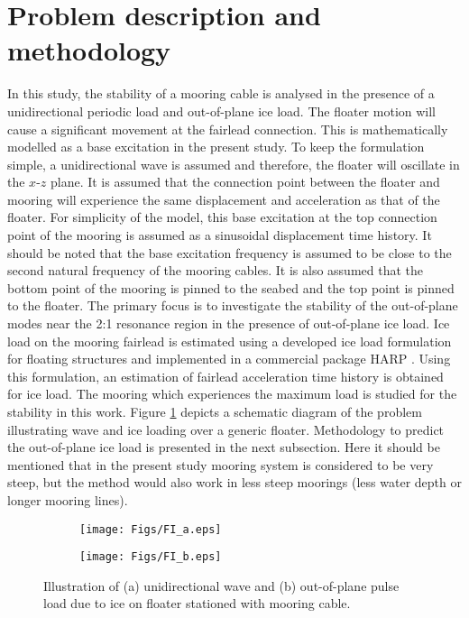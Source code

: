 \documentclass[review]{elsarticle}
\begin{document}
\section{Problem description and methodology} 
In this study, the stability of a mooring cable is analysed in the presence of a unidirectional periodic load and out-of-plane ice load. The floater motion will cause a significant movement at the fairlead connection. This is mathematically modelled as a base excitation in the present study. To keep the formulation simple, a unidirectional wave is assumed and therefore, the floater will oscillate in the $x$-$z$ plane. It is assumed that the connection point between the floater and mooring will experience the same displacement and acceleration as that of the floater. For simplicity of the model, this base excitation at the top connection point of the mooring is assumed as a sinusoidal displacement time history. It should be noted that the base excitation frequency is assumed to be close to the second natural frequency of the mooring cables. It is also assumed that the bottom point of the mooring is pinned to the seabed and the top point is pinned to the floater. The primary focus is to investigate the stability of the out-of-plane modes near the 2:1 resonance region in the presence of out-of-plane ice load. Ice load on the mooring fairlead is estimated using a developed ice load formulation for floating structures and implemented in a commercial package HARP \cite{HARP}. Using this formulation, an estimation of fairlead acceleration time history is obtained for ice load. The mooring which experiences the maximum load is studied for the stability in this work. Figure \ref{floater_ice} depicts a schematic diagram of the problem illustrating wave and ice loading over a generic floater. Methodology to predict the out-of-plane ice load is presented in the next subsection. Here it should be mentioned that in the present study mooring system is considered to be very steep, but the method would also work in less steep moorings (less water depth or longer mooring lines).
\begin{figure}
	\centering
	\begin{subfigure}{.5\textwidth}
		\centering
		\texttt{[image: Figs/FI\_a.eps]}
		\caption{}
	\end{subfigure}%
	\begin{subfigure}{.42\textwidth}
		\centering
		\texttt{[image: Figs/FI\_b.eps]}
		\caption{}
	\end{subfigure}
	\caption{Illustration of (a) unidirectional wave and (b) out-of-plane pulse load due to ice  on floater stationed with mooring cable.}
	\label{floater_ice}
\end{figure}
\end{document}
